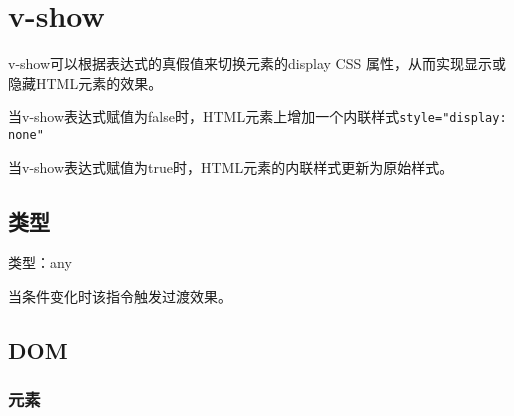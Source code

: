 \begin{lstlisting}[language=JavaScript]

\end{lstlisting}




\begin{lstlisting}[language=JavaScript]

\end{lstlisting}




\begin{lstlisting}[language=JavaScript]

\end{lstlisting}




\begin{lstlisting}[language=JavaScript]

\end{lstlisting}

\chapter{v-show}

v-show可以根据表达式的真假值来切换元素的display CSS 属性，从而实现显示或隐藏HTML元素的效果。

\begin{compactitem}
\item 当v-show表达式赋值为false时，HTML元素上增加一个内联样式\texttt{style="display: none"}
\item 当v-show表达式赋值为true时，HTML元素的内联样式更新为原始样式。
\end{compactitem}

\section{类型}

\begin{compactitem}
\item 类型：any
\end{compactitem}

当条件变化时该指令触发过渡效果。

\section{DOM}

\subsection{元素}


